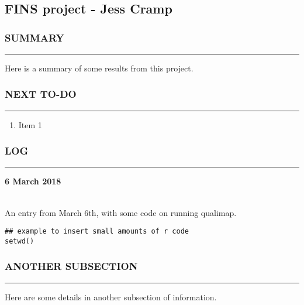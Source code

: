 \clearpage
\chapter{}
\section{FINS project - Jess Cramp}

\subsection*{SUMMARY}
\hrule
Here is a summary of some results from this project.


\subsection*{NEXT TO-DO}
\hrule

\begin{enumerate}
\item Item 1
\end{enumerate}


\subsection*{LOG}
\hrule
\hrulefill
\begin{large} \textbf{6 March 2018} \end{large} \\
An entry from March 6th, with some code on running qualimap.

\begin{verbatim}
## example to insert small amounts of r code
setwd()
\end{verbatim}


\subsection*{ANOTHER SUBSECTION}
\hrule
Here are some details in another subsection of information.


